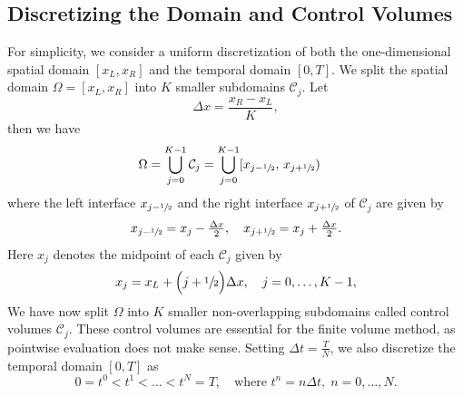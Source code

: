 \subsection{Discretizing the Domain and Control Volumes}
For simplicity, we consider a uniform discretization of both the one-dimensional spatial domain $[x_L, x_R]$ and the temporal domain $[0, T]$.
We split the spatial domain $\Omega = [x_L, x_R]$ into $K$ smaller subdomains $\mathcal{C}_j$. Let
\[
    \Delta x = \dfrac{x_R - x_L}{K},
\]
then we have
\begin{equation}
    \begin{split}
        \Omega & = \bigcup_{j=0}^{K-1} \mathcal{C}_j =  \bigcup_{j=0}^{K-1} [x_{j-\sfrac{1}{2}},\, x_{j+\sfrac{1}{2}})
    \end{split}
\end{equation}
where the left interface $x_{j-\sfrac{1}{2}}$ and the right interface $x_{j+\sfrac{1}{2}}$ of $\mathcal{C}_{j}$ are given by
\[
    x_{j-\sfrac{1}{2}} = x_j - \tfrac{\Delta x}{2},\quad
    x_{j+\sfrac{1}{2}} = x_j + \tfrac{\Delta x}{2}.
\]
Here $x_j$ denotes the midpoint of each $\mathcal{C}_j$ given by
\[
    x_j = x_L + \Big(j + \sfrac{1}{2}\Big)\Delta x,\quad j = 0,\dots,K-1,
\]
We have now split $\Omega$ into $K$ smaller non-overlapping subdomains called control volumes $\mathcal{C}_j$. These control volumes are essential for the finite volume method, as pointwise evaluation does not make sense. Setting $\Delta t = \frac{T}{N}$, we also discretize the temporal domain $[0,T]$ as
\[
    0 = t^{0} < t^{1} < \dots < t^{N} = T,\quad \text{where } t^n = n\Delta t,\; n = 0,\dots,N.
\]

